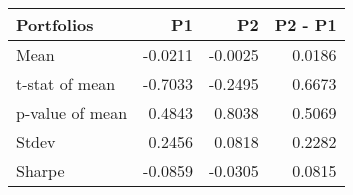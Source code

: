 \begin{tabular}{lrrr}
\toprule
Portfolios & P1 & P2 & P2 - P1 \\
\midrule
Mean & -0.0211 & -0.0025 & 0.0186 \\
t-stat of mean & -0.7033 & -0.2495 & 0.6673 \\
p-value of mean & 0.4843 & 0.8038 & 0.5069 \\
Stdev & 0.2456 & 0.0818 & 0.2282 \\
Sharpe & -0.0859 & -0.0305 & 0.0815 \\
\bottomrule
\end{tabular}

